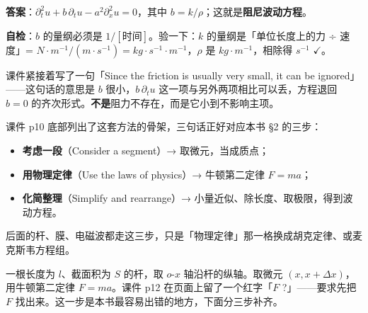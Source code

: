 \textbf{答案}：$\partial_t^2u+b\,\partial_t u-a^2\partial_x^2u=0$，其中 $b=k/\rho$；这就是\textbf{阻尼波动方程}。

\textbf{自检}：$b$ 的量纲必须是 $1/[\text{时间}]$。验一下：$k$ 的量纲是「单位长度上的力 ÷ 速度」= $\unit{N\cdot m^{-1}/(m\cdot s^{-1})}=\unit{kg\cdot s^{-1}\cdot m^{-1}}$，$\rho$ 是 $\unit{kg\cdot m^{-1}}$，相除得 $\unit{s^{-1}}$ $\checkmark$。

课件紧接着写了一句「Since the friction is usually very small, it can be ignored」——这句话的意思是 $b$ 很小，$b\,\partial_t u$ 这一项与另外两项相比可以丢，方程退回 $b=0$ 的齐次形式。\textbf{不是}阻力不存在，而是它小到不影响主项。


课件 p10 底部列出了这套方法的骨架，三句话正好对应本书 §2 的三步：

\begin{itemize}
\item \textbf{考虑一段}（Consider a segment）→ 取微元，当成质点；
\item \textbf{用物理定律}（Use the laws of physics）→ 牛顿第二定律 $F=ma$；
\item \textbf{化简整理}（Simplify and rearrange）→ 小量近似、除长度、取极限，得到波动方程。
\end{itemize}

后面的杆、膜、电磁波都走这三步，只是「物理定律」那一格换成胡克定律、或麦克斯韦方程组。

\label{sec:714}



一根长度为 $l$、截面积为 $S$ 的杆，取 $o$-$x$ 轴沿杆的纵轴。取微元 $(x,x+\Delta x)$，用牛顿第二定律 $F=ma$。课件 p12 在页面上留了一个红字「$F$ ?」——要求先把 $F$ 找出来。这一步是本书最容易出错的地方，下面分三步补齐。

